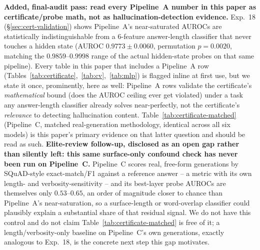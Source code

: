 \documentclass[onecolumn]{jmlr}
\begin{document}
\textbf{Added, final-audit pass: read every Pipeline~A number in this
paper as certificate/probe math, not as hallucination-detection
evidence.} Exp.~18 (\S\ref{sec:cert-validation}) shows Pipeline~A's
near-saturated AUROCs are statistically indistinguishable from a
6-feature answer-length classifier that never touches a hidden state
(AUROC $0.9773\pm0.0060$, permutation $p=0.0020$, matching the
$0.9859$--$0.9998$ range of the actual hidden-state probes on that same
pipeline). Every table in this paper that includes a Pipeline~A row
(Tables~\ref{tab:certificate},~\ref{tab:cv},~\ref{tab:mlp}) is flagged
inline at first use, but we state it once, prominently, here as well:
Pipeline~A rows validate the certificate's \emph{mathematical} bound
(does the AUROC ceiling ever get violated) under a task any answer-length
classifier already solves near-perfectly, not the certificate's
\emph{relevance} to detecting hallucination content. Table~\ref{tab:certificate-matched}
(Pipeline~C, matched real-generation methodology, identical across all
six models) is this paper's primary evidence on that latter question and
should be read as such. \textbf{Elite-review follow-up, disclosed as an
open gap rather than silently left: this same surface-only confound
check has never been run on Pipeline~C.} Pipeline~C scores real,
free-form generations by SQuAD-style exact-match/F1 against a reference
answer -- a metric with its own length- and verbosity-sensitivity --
and its best-layer probe AUROCs are themselves only $0.53$--$0.65$, an order of
magnitude closer to chance than Pipeline~A's near-saturation, so a
surface-length or word-overlap classifier could plausibly explain a
substantial share of that residual signal. We do not have this control
and do not claim Table~\ref{tab:certificate-matched} is free of it; a
length/verbosity-only baseline on Pipeline~C's own generations, exactly
analogous to Exp.~18, is the concrete next step this gap motivates.
\end{document}
